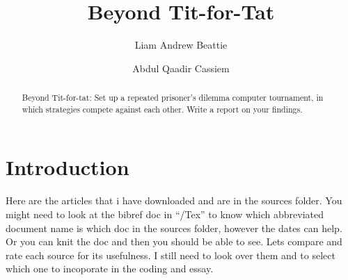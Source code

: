 \documentclass[11pt,preprint]{elsarticle}
\numberwithin{equation}{section}
\numberwithin{figure}{section}
\numberwithin{table}{section}
\begin{document}
\begin{frontmatter}  %

\title{Beyond Tit-for-Tat}





\author[Add1]{Liam Andrew Beattie}

\author[Add1]{Abdul Qaadir Cassiem}




\address[Add1]{Microeconomics 871, Stellenbosch University, South
Africa}


\begin{abstract}
\small{
Beyond Tit-for-tat: Set up a repeated prisoner's dilemma computer
tournament, in which strategies compete against each other. Write a
report on your findings.
}
\end{abstract}

\vspace{1cm}





\vspace{0.5cm}

\end{frontmatter}

\setcounter{footnote}{0}



\pagestyle{fancy}
\chead{}
\rhead{}
\lfoot{}
\lhead{}
\cfoot{}


\headsep 35pt %




\section{\texorpdfstring{Introduction
\label{Introduction}}{Introduction }}\label{introduction}

Here are the articles that i have downloaded and are in the sources
folder. You might need to look at the bibref doc in ``/Tex'' to know
which abbreviated document name is which doc in the sources folder,
however the dates can help. Or you can knit the doc and then you should
be able to see. Lets compare and rate each source for its usefulness. I
still need to look over them and to select which one to incoporate in
the coding and essay.
\end{document}
